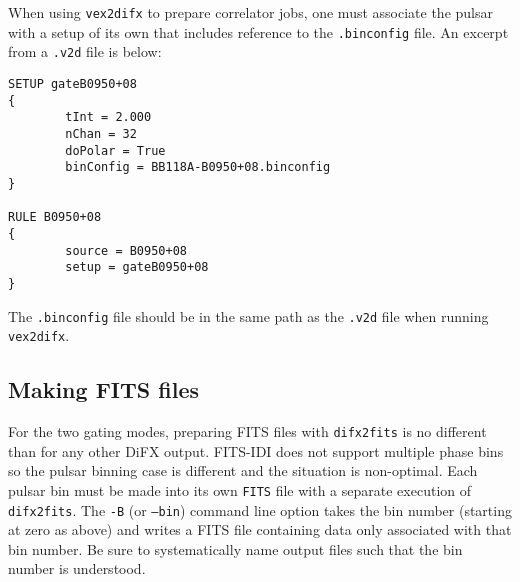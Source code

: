 When using {\tt vex2difx} to prepare correlator jobs, one must associate the pulsar with a setup of its own that includes reference to the {\tt .binconfig} file.
An excerpt from a {\tt .v2d} file is below:

\begin{verbatim}
SETUP gateB0950+08
{
        tInt = 2.000
        nChan = 32
        doPolar = True
        binConfig = BB118A-B0950+08.binconfig
}

RULE B0950+08
{
        source = B0950+08
        setup = gateB0950+08
}
\end{verbatim}

The {\tt .binconfig} file should be in the same path as the {\tt .v2d} file when running {\tt vex2difx}.

\subsection{Making FITS files}

For the two gating modes, preparing FITS files with {\tt difx2fits} is no different than for any other DiFX output.
FITS-IDI does not support multiple phase bins so the pulsar binning case is different and the situation is non-optimal.
Each pulsar bin must be made into its own {\tt FITS} file with a separate execution of {\tt difx2fits}.  
The {\tt -B} (or {\tt --bin}) command line option takes the bin number (starting at zero as above) and writes a FITS file containing data only associated with that bin number.
Be sure to systematically name output files such that the bin number is understood.
